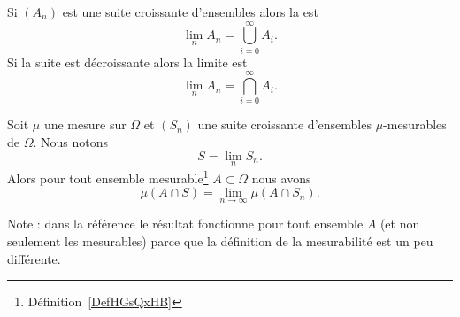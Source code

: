\begin{definition}
    Si \( (A_n)\) est une suite croissante d'ensembles alors la  est
    \begin{equation}
        \lim_nA_n=\bigcup_{i=0}^{\infty}A_i.
    \end{equation}
    Si la suite est décroissante alors la limite est
    \begin{equation}
        \lim_nA_n=\bigcap_{i=0}^{\infty}A_i.
    \end{equation}
\end{definition}


\begin{proposition} \label{PropAFNPSsm}
    Soit \( \mu\) une mesure sur \( \Omega\) et \( (S_n)\) une suite croissante d'ensembles \( \mu\)-mesurables de \( \Omega\). Nous notons
    \begin{equation}
        S=\lim_nS_n.
    \end{equation}
    Alors pour tout ensemble mesurable\footnote{Définition~\ref{DefHGsQxHB}} \( A\subset\Omega\) nous avons
    \begin{equation}
        \mu(A\cap S)=\lim_{n\to \infty} \mu(A\cap S_n).
    \end{equation}
\end{proposition}
Note : dans la référence le résultat fonctionne pour tout ensemble \( A\) (et non seulement les mesurables) parce que la définition de la mesurabilité est un peu différente.

